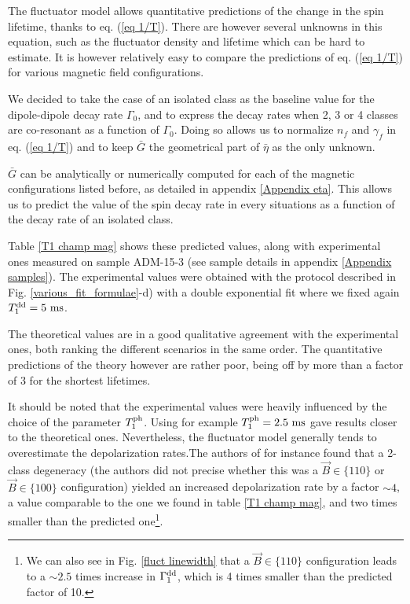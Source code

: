 \documentclass[a4paper, 11pt]{report}
\begin{document}
The fluctuator model allows quantitative predictions of the change in the spin lifetime, thanks to eq. (\ref{eq 1/T}). There are however several unknowns in this equation, such as the fluctuator density and lifetime which can be hard to estimate. It is however relatively easy to compare the predictions of eq. (\ref{eq 1/T}) for various magnetic field configurations.

We decided to take the case of an isolated class as the baseline value for the dipole-dipole decay rate $\Gamma_0$, and to express the decay rates when 2, 3 or 4 classes are co-resonant as a function of $\Gamma_0$. Doing so allows us to normalize $n_f$ and $\gamma_f$ in eq. (\ref{eq 1/T}) and to keep $\bar G$ the geometrical part of $\bar \eta$ as the only unknown.

$\bar G$ can be analytically or numerically computed for each of the magnetic configurations listed before, as detailed in appendix \ref{Appendix eta}. This allows us to predict the value of the spin decay rate in every situations as a function of the decay rate of an isolated class.

Table \ref{T1 champ mag} shows these predicted values, along with experimental ones measured on sample ADM-15-3 (see sample details in appendix \ref{Appendix samples}). The experimental values were obtained with the protocol described in Fig. \ref{various_fit_formulae}-d) with a double exponential fit where we fixed again $T_1^{\rm dd}=5\ \rm ms$.

The theoretical values are in a good qualitative agreement with the experimental ones, both ranking the different scenarios in the same order. The quantitative predictions of the theory however are rather poor, being off by more than a factor of 3 for the shortest lifetimes.

It should be noted that the experimental values were heavily influenced by the choice of the parameter $T_1^{\rm ph}$. Using for example $T_1^{\rm ph}=2.5\ \rm ms$ gave results closer to the theoretical ones. Nevertheless, the fluctuator model generally tends to overestimate the depolarization rates.The authors of \citep{choi2017depolarization} for instance found that a 2-class degeneracy (the authors did not precise whether this was a $\vec{B} \in \{110\}$ or $\vec{B} \in \{100\}$ configuration) yielded an increased depolarization rate by a factor $\sim 4$, a value comparable to the one we found in table \ref{T1 champ mag}, and two times smaller than the predicted one\footnote{We can also see in Fig. \ref{fluct linewidth} that a $\vec{B} \in \{110\}$ configuration leads to a $\sim 2.5$ times increase in $\Gamma_1^{\rm dd}$, which is 4 times smaller than the predicted factor of 10.}.
\end{document}
